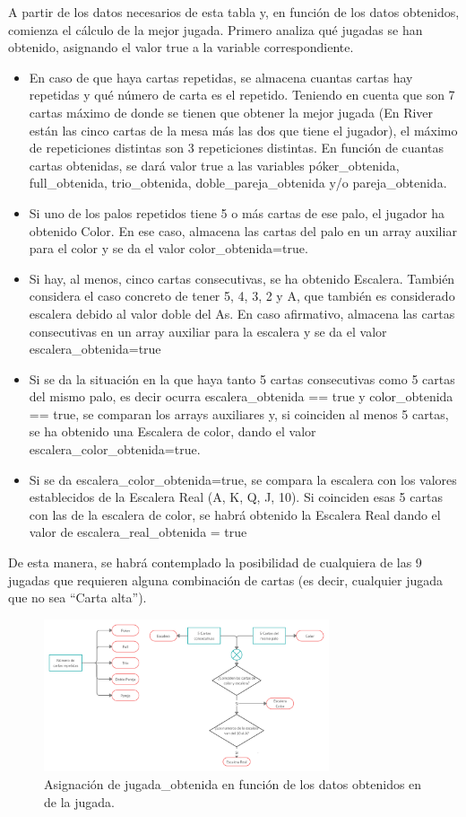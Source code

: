 A partir de los datos necesarios de esta tabla y, en función de los datos obtenidos, comienza el cálculo de la mejor jugada. Primero analiza qué jugadas se han obtenido, asignando el valor true a la variable correspondiente. 
\begin{itemize}
\item En caso de que haya cartas repetidas, se almacena cuantas cartas hay repetidas y qué número de carta es el repetido. Teniendo en cuenta que son 7 cartas máximo de donde se tienen que obtener la mejor jugada (En River están las cinco cartas de la mesa más las dos que tiene el jugador), el máximo de repeticiones distintas son 3 repeticiones distintas. En función de cuantas cartas obtenidas, se dará valor true a las variables póker\_obtenida, full\_obtenida, trio\_obtenida, doble\_pareja\_obtenida y/o pareja\_obtenida.
\item Si uno de los palos repetidos tiene 5 o más cartas de ese palo, el jugador ha obtenido Color. En ese caso, almacena las cartas del palo en un array auxiliar para el color y se da el valor color\_obtenida=true.
\item Si hay, al menos, cinco cartas consecutivas, se ha obtenido Escalera. También considera el caso concreto de tener 5, 4, 3, 2 y A, que también es considerado escalera debido al valor doble del As. En caso afirmativo, almacena las cartas consecutivas en un array auxiliar para la escalera y se da el valor escalera\_obtenida=true
\item Si se da la situación en la que haya tanto 5 cartas consecutivas como 5 cartas del mismo palo, es decir ocurra  escalera\_obtenida == true y color\_obtenida == true, se comparan los arrays auxiliares y, si coinciden al menos 5 cartas, se ha obtenido una Escalera de color, dando el valor escalera\_color\_obtenida=true.
\item Si se da escalera\_color\_obtenida=true, se compara la escalera con los valores establecidos de la Escalera Real (A, K, Q, J, 10). Si coinciden esas 5 cartas con las de la escalera de color, se habrá obtenido la Escalera Real dando el valor de escalera\_real\_obtenida = true
 \end{itemize}

De esta manera, se habrá contemplado la posibilidad de cualquiera de las 9 jugadas que requieren alguna combinación de cartas (es decir, cualquier jugada que no sea “Carta alta”).
\begin{figure}[h]
\centering
\includegraphics[width=0.75\textwidth]{figuras/grafo1.png}   
\caption{Asignación de jugada\_obtenida en función de los datos obtenidos en de la jugada.\cite{propiaCreately}}
\label{fig:jugada_ob}
\end{figure}

